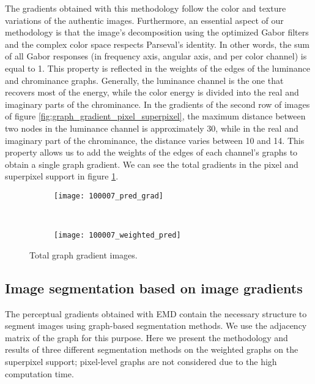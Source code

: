 The gradients obtained with this methodology follow the color and texture variations of the authentic images. Furthermore, an essential aspect of our methodology is that the image's decomposition using the optimized Gabor filters and the complex color space respects Parseval's identity. In other words, the sum of all Gabor responses (in frequency axis, angular axis, and per color channel) is equal to 1. This property is reflected in the weights of the edges of the luminance and chrominance graphs. Generally, the luminance channel is the one that recovers most of the energy, while the color energy is divided into the real and imaginary parts of the chrominance. In the gradients of the second row of images of figure \ref{fig:graph_gradient_pixel_superpixel}, the maximum distance between two nodes in the luminance channel is approximately 30, while in the real and imaginary part of the chrominance, the distance varies between 10 and 14. This property allows us to add the weights of the edges of each channel's graphs to obtain a single graph gradient. We can see the total gradients in the pixel and superpixel support in figure \ref{fig:total_graph_gradient_pixel_superpixel}.

\begin{figure}[!ht]
    \centering
    \begin{subfigure}[b]{0.45\textwidth}
    	\texttt{[image: 100007\_pred\_grad]} 
    \end{subfigure}      
    ~ %
    \begin{subfigure}[b]{0.45\textwidth}
        \texttt{[image: 100007\_weighted\_pred]}
    \end{subfigure}    
	\caption{Total graph gradient images.}\label{fig:total_graph_gradient_pixel_superpixel}    
\end{figure}

\subsection{Image segmentation based on image gradients}
The perceptual gradients obtained with EMD contain the necessary structure to segment images using graph-based segmentation methods. We use the adjacency matrix of the graph for this purpose. Here we present the methodology and results of three different segmentation methods on the weighted graphs on the superpixel support; pixel-level graphs are not considered due to the high computation time. 

